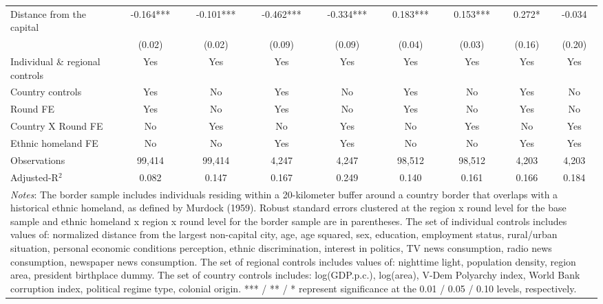 \documentclass[11pt]{article}
\theoremstyle{plain}
\theoremstyle{plain}
\begin{document}
\begin{table}[H]
{\begin{tabular}{@{\extracolsep{5pt}} l c c c c c c c c}
   Distance from the capital&      -0.164***&      -0.101***&      -0.462***&      -0.334***&       0.183***&       0.153***&       0.272*  &      -0.034   \\
   \medskip
   &      (0.02)   &      (0.02)   &      (0.09)   &      (0.09)   &      (0.04)   &      (0.03)   &      (0.16)   &      (0.20)   \\
   \midrule
   \smallskip
  Individual \& regional controls  & Yes & Yes & Yes & Yes& Yes & Yes & Yes & Yes  \\
  \smallskip
  Country controls & Yes& No& Yes& No& Yes& No& Yes& No\\
  \smallskip
  Round FE & Yes & No& Yes & No& Yes & No& Yes & No\\
  \smallskip
  Country X Round FE       & No & Yes& No & Yes& No & Yes& No & Yes\\
  \smallskip
  Ethnic homeland FE & No & No & Yes& Yes& No & No & Yes& Yes\\
  \smallskip
  Observations           &       99,414   &       99,414   &        4,247   &        4,247   &       98,512   &       98,512   &        4,203   &        4,203   \\
  Adjusted-R$^2$         &       0.082   &       0.147   &       0.167   &       0.249   &       0.140   &       0.161   &       0.166   &       0.184   \\
                        \bottomrule
  \multicolumn{9}{p{21cm}}{\footnotesize \emph{Notes}: The border sample includes individuals residing within a 20-kilometer buffer around a country border that overlaps with a historical ethnic homeland, as defined by Murdock (1959). Robust standard errors clustered at the region x round level  for the base sample and ethnic homeland x region x round level for the border sample are in parentheses. The set of individual controls
  includes values of: normalized distance from the largest non-capital city, age, age squared, sex,
  education, employment status, rural/urban situation, personal economic conditions perception, ethnic discrimination, interest in politics, TV news consumption, radio news consumption, newspaper news consumption. The set of regional controls includes values of: nighttime light, population density, region area, president birthplace dummy. The set of country controls includes: log(GDP.p.c.), log(area), V-Dem Polyarchy index, World Bank corruption index, political regime type, colonial origin. *** / ** / * represent significance at the 0.01 / 0.05 / 0.10 levels, respectively.}
  \end{tabular}
  }
  \end{table}
\end{document}
